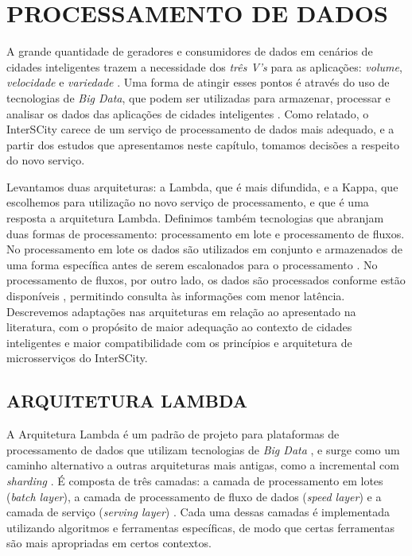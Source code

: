 \chapter[PROCESSAMENTO DE DADOS]{PROCESSAMENTO DE DADOS}
\label{chapter:data}

A grande quantidade de geradores e consumidores de dados em cenários de cidades
inteligentes trazem a necessidade dos \textit{três V's} para as aplicações:
\textit{volume}, \textit{velocidade} e \textit{variedade} \cite{alnuaimi2015}.
Uma forma de atingir esses pontos é através do uso de tecnologias de
\textit{Big Data}, que podem ser utilizadas para armazenar, processar e analisar
os dados das aplicações de cidades inteligentes \cite{alnuaimi2015}. Como
relatado, o InterSCity carece de um serviço de processamento de dados mais
adequado, e a partir dos estudos que apresentamos neste capítulo, tomamos
decisões a respeito do novo serviço.

Levantamos duas arquiteturas: a Lambda, que é mais difundida, e a Kappa,
que escolhemos para utilização no novo serviço de processamento, e que é
uma resposta a arquitetura Lambda. Definimos também tecnologias que abranjam duas
formas de processamento: processamento em lote e processamento de fluxos.
No processamento em lote os dados são utilizados
em conjunto e armazenados de uma forma específica antes de serem escalonados
para o processamento \cite{zheng2015real}. No processamento
de fluxos, por outro lado, os dados são processados conforme estão
disponíveis \cite{zheng2015real}, permitindo consulta às informações com menor
latência. Descrevemos adaptações nas arquiteturas em relação ao apresentado
na literatura, com o propósito de maior adequação ao contexto de cidades
inteligentes e maior compatibilidade com os princípios e arquitetura de
microsserviços do InterSCity.

\section{ARQUITETURA LAMBDA}

A Arquitetura Lambda é um padrão de projeto para plataformas de processamento
de dados que utilizam tecnologias de \textit{Big Data} \cite{kiran2015}, e
surge como um caminho alternativo a outras arquiteturas mais antigas, como a
incremental com \textit{sharding} \cite{marz2015}. É composta de três camadas:
a camada de processamento em lotes (\textit{batch layer}), a camada de processamento de
fluxo de dados (\textit{speed layer}) e a camada de serviço (\textit{serving
layer}) \cite{kiran2015}. Cada uma dessas
camadas é implementada utilizando algoritmos e ferramentas específicas, de modo
que certas ferramentas são mais apropriadas em certos contextos.

